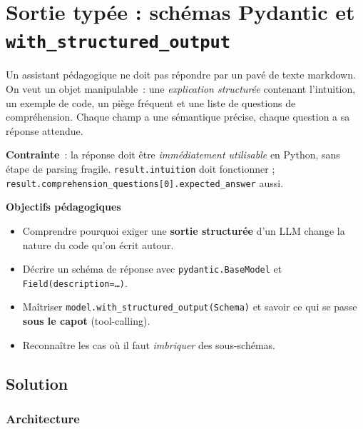 \documentclass[11pt,a4paper]{article}
\begin{document}
\section{Sortie typée : schémas Pydantic et \texttt{with\_structured\_output}}

\begin{tcolorbox}[title=Exercice 2. Sortie typée avec Pydantic]
Un assistant pédagogique ne doit pas répondre par un pavé de texte
markdown. On veut un objet manipulable~: une \emph{explication structurée}
contenant l'intuition, un exemple de code, un piège fréquent et une liste
de questions de compréhension. Chaque champ a une sémantique précise,
chaque question a sa réponse attendue.

\textbf{Contrainte}~: la réponse doit être \emph{immédiatement utilisable}
en Python, sans étape de parsing fragile. \texttt{result.intuition} doit
fonctionner ; \texttt{result.comprehension\_questions[0].expected\_answer}
aussi.

\bigskip
\noindent\textbf{Objectifs pédagogiques}
\begin{itemize}[leftmargin=*]
  \item Comprendre pourquoi exiger une \textbf{sortie structurée} d'un LLM
        change la nature du code qu'on écrit autour.
  \item Décrire un schéma de réponse avec \texttt{pydantic.BaseModel} et
        \texttt{Field(description=\dots)}.
  \item Maîtriser \texttt{model.with\_structured\_output(Schema)} et savoir
        ce qui se passe \textbf{sous le capot} (tool-calling).
  \item Reconnaître les cas où il faut \emph{imbriquer} des sous-schémas.
\end{itemize}
\end{tcolorbox}

\subsection{Solution}

\subsubsection{Architecture}
\end{document}
